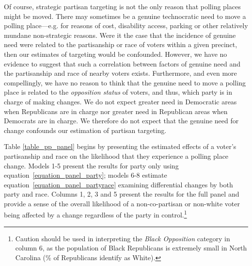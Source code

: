\documentclass[12pt]{article}
\begin{document}
Of course, strategic partisan targeting is not the only reason that polling places might be moved.  There may sometimes be a genuine technocratic need to move a polling place---e.g. for reasons of cost, disability access, parking or other relatively mundane non-strategic reasons.  Were it the case that the incidence of genuine need were related to the partisanship or race of voters within a given precinct, then our estimates of targeting would be confounded.  However, we have no evidence to suggest that such a correlation between factors of genuine need and the partisanship and race of nearby voters exists.  Furthermore, and even more compellingly, we have no reason to think that the genuine need to move a polling place is related to the \emph{opposition status} of voters, and thus, which party is in charge of making changes.  We do not expect greater need in Democratic areas when Republicans are in charge nor greater need in Republican areas when Democrats are in charge. We therefore do not expect that the genuine need for change confounds our estimation of partisan targeting.

Table \ref{table_pp_panel} begins by presenting the estimated effects of a voter's partisanship and race on the likelihood that they experience a polling place change. Models 1-5 present the results for party only using equation~\ref{equation_panel_party}; models 6-8 estimate equation~\ref{equation_panel_partyrace} examining differential changes by both party and race.   Columns 1, 2, 3 and 5 present the results for the full panel and provide a sense of the overall likelihood of a non-co-partisan or non-white voter being affected by a change regardless of the party in control.\footnote{Caution should be used in interpreting the \emph{Black Opposition} category in column 6, as the population of Black Republicans is extremely small in North Carolina (\unskip\% of Republicans identify as White).}
\end{document}
